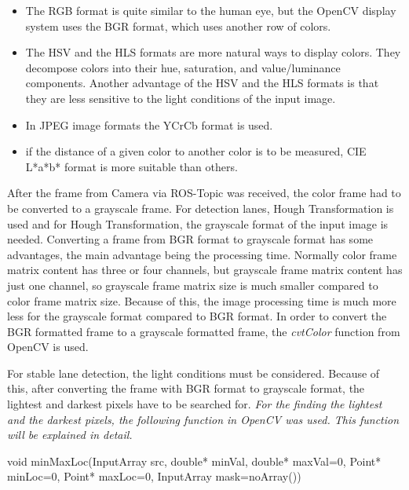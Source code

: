 \begin{itemize}

\item The RGB format is quite similar to the human eye, but the OpenCV display system uses the BGR format, which uses another row of colors.  

\item The HSV and the HLS formats are more natural ways to display colors. They decompose colors into their hue, saturation, and value/luminance components. Another advantage of the HSV and the HLS formats is that they are less sensitive to the light conditions of the input image.

\item In JPEG image formats the YCrCb format is used.

\item if the distance of a given color to another color is to be measured, CIE L*a*b* format is more suitable than others.

\end{itemize}

After the frame from Camera via ROS-Topic was received, the color frame had to be converted to a grayscale frame. For detection lanes, Hough Transformation is used and for Hough Transformation, the grayscale format of the input image is needed. Converting a frame from BGR format to grayscale format has some advantages, the main advantage being the processing time. Normally color frame matrix content has three or four channels, but grayscale frame matrix content has just one channel, so grayscale frame matrix size is much smaller compared to color frame matrix size. Because of this, the image processing time is much more less for the grayscale format compared to BGR format. In order to convert the BGR formatted frame to a grayscale formatted frame, the \textit{cvtColor} function from OpenCV is used.

For stable lane detection, the light conditions must be considered. Because of this, after converting the frame with BGR format to grayscale format, the lightest and darkest pixels have to be searched for. \emph{\color{blue}For the finding the lightest and the darkest pixels, the following function in OpenCV was used. This function will be explained in detail.}\citep{addWeighted}


\begin{center}

void minMaxLoc(InputArray src, double* minVal, double* maxVal=0, Point* minLoc=0, Point* maxLoc=0, InputArray mask=noArray())

\end{center}

